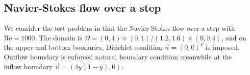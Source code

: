 \documentclass[a4paper, 11pt]{article}
\begin{document}



   \subsection{Navier-Stokes flow over a step}

      We consider the test problem in \cite{zheng2010posteriori} that the
      Navier-Stokes flow over a step with $\text{Re} = 1000$. The
      domain is $\Omega = (0, 4) \times (0, 1)/(1.2, 1.6) \times (0,
      0.4)$, and on the upper and bottom boudaries, Dirichlet
      condition $\vec{u} = (0, 0)^T$ is imposed. Outflow boundary is
      enforced natural boundary condition meanwhile at the inflow
      boundary $\vec{u} = (4 y (1 - y), 0)$.
\end{document}

